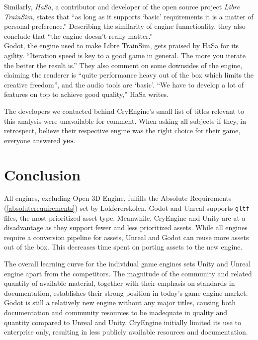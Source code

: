 Similarly, \textit{HaSa}, a contributor and developer of the open source project \textit{Libre TrainSim}, states that “as long as it supports `basic' requirements it is a matter of personal preference.” Describing the similarity of engine funnctioality, they also conclude that “the engine doesn't really matter.” \\[0.8cm]

Godot, the engine used to make Libre TrainSim, gets praised by HaSa for its agility. “Iteration speed is key to a good game in general. The more you iterate the better the result is.” They also comment on some downsides of the engine, claiming the renderer is “quite performance heavy out of the box which limits the creative freedom”, and the audio tools are `basic'. “We have to develop a lot of features on top to achieve good quality,” HaSa writes.

The developers we contacted behind CryEngine's small list of titles relevant to this analysis were unavailable for comment. When asking all subjects if they, in retrospect, believe their respective engine was the right choice for their game, everyone answered \textbf{yes}. 


\section{Conclusion}
All engines, excluding Open 3D Engine, fulfills the Absolute Requirements (\ref{absoluterequirements}) set by Lokførerskolen. Godot and Unreal supports \texttt{gltf}-files, the most prioritized asset type. Meanwhile, CryEngine and Unity are at a disadvantage as they support fewer and less prioritized assets. While all engines require a conversion pipeline for assets, Unreal and Godot can reuse more assets out of the box. This decreases time spent on porting assets to the new engine.

The overall learning curve for the individual game engines sets Unity and Unreal engine apart from the competitors. The magnitude of the community and related quantity of available material, together with their emphasis on standards in documentation, establishes their strong position in today's game engine market. Godot is still a relatively new engine without any major titles, causing both documentation and community resources to be inadequate in quality and quantity compared to Unreal and Unity. CryEngine initially limited its use to enterprise only, resulting in less publicly available resources and documentation.

